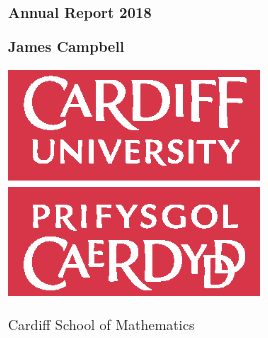 
\begin{titlepage}
    \begin{center}
        \vspace*{2cm}

        \textbf{Annual Report 2018}

        \vspace{1.5cm}

        \textbf{James Campbell}
        \vspace{1.5cm}

        \includegraphics[width=0.5\textwidth]{../img/universitylogo.eps}

        \vfill



        \vspace{0.5cm}
        Cardiff School of Mathematics

        \vspace{1.5cm}



    \end{center}
\end{titlepage}
